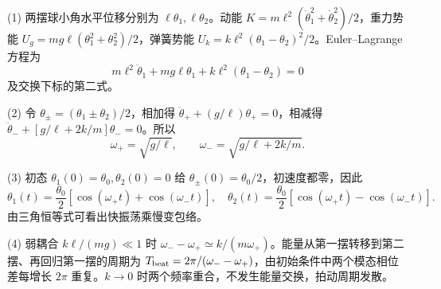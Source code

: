 (1) 两摆球小角水平位移分别为 \(\ell\theta_1,\ell\theta_2\)。动能 \(K=m\ell^2(\dot\theta_1^2+\dot\theta_2^2)/2\)，重力势能 \(U_g=mg\ell(\theta_1^2+\theta_2^2)/2\)，弹簧势能 \(U_k=k\ell^2(\theta_1-\theta_2)^2/2\)。Euler–Lagrange 方程为
\[
m\ell^2\ddot\theta_1+mg\ell\theta_1+k\ell^2(\theta_1-\theta_2)=0
\]
及交换下标的第二式。

(2) 令 \(\theta_\pm=(\theta_1\pm\theta_2)/2\)，相加得 \(\ddot\theta_++(g/\ell)\theta_+=0\)，相减得 \(\ddot\theta_-+[g/\ell+2k/m]\theta_-=0\)。所以
\[
\omega_+=\sqrt{g/\ell},\qquad\omega_-=\sqrt{g/\ell+2k/m}.
\]

(3) 初态 \(\theta_1(0)=\theta_0,\theta_2(0)=0\) 给 \(\theta_\pm(0)=\theta_0/2\)，初速度都零，因此
\[
\theta_1(t)=\frac{\theta_0}2[\cos(\omega_+t)+\cos(\omega_-t)],
\quad
\theta_2(t)=\frac{\theta_0}2[\cos(\omega_+t)-\cos(\omega_-t)].
\]
由三角恒等式可看出快振荡乘慢变包络。

(4) 弱耦合 \(k\ell/(mg)\ll1\) 时 \(\omega_--\omega_+\simeq k/(m\omega_+)\)。能量从第一摆转移到第二摆、再回归第一摆的周期为 \(T_{\rm beat}=2\pi/(\omega_--\omega_+)\)，由初始条件中两个模态相位差每增长 \(2\pi\) 重复。\(k\to 0\) 时两个频率重合，不发生能量交换，拍动周期发散。
